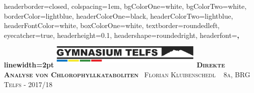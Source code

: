 \documentclass[landscape,a0paper,fontscale=0.285]{baposter} %
\begin{document}
\begin{poster}
{
headerborder=closed, %
colspacing=1em, %
bgColorOne=white, %
bgColorTwo=white, %
borderColor=lightblue, %
headerColorOne=black, %
headerColorTwo=lightblue, %
headerFontColor=white, %
boxColorOne=white, %
textborder=roundedleft, %
eyecatcher=true, %
headerheight=0.1\textheight, %
headershape=roundedright, %
headerfont=\Large\bf\textsc, %
linewidth=2pt %
}
%
{\includegraphics[height=4em, width=20em]{logo.png}} %
{\bf\textsc{Direkte Analyse von Chlorophyllkataboliten}\vspace{0.5em}} %
{\textsc{\ Florian Kluibenschedl \ \hspace{12pt} 8a, BRG Telfs - 2017/18}} %


\end{poster}
\end{document}

